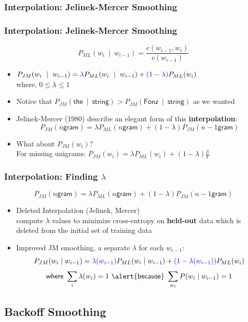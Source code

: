 \documentclass{beamer}
\begin{document}
\subsubsection{Interpolation: Jelinek-Mercer Smoothing}

\begin{frame}
\frametitle{Interpolation: Jelinek-Mercer Smoothing}
\[ P_{ML}(w_i~\mid~w_{i-1}) = \frac{ c(w_{i-1},w_i) } { c(w_{i-1}) } \]
\begin{itemize}[<+->]
\item $P_{JM}(w_i~\mid~w_{i-1}) = {\color{blue} \lambda} P_{ML}(w_i~\mid~w_{i-1}) +  {\color{blue} (1 - \lambda) }P_{ML}(w_{i})$ \\
 where, $0 \leq \lambda \leq 1$
\item Notice that  $P_{JM}(\textsf{the}~\mid~\textsf{string}) > P_{JM}(\textsf{Fonz}~\mid~\textsf{string})$ as we wanted
\item Jelinek-Mercer (1980) describe an elegant form of this {\bf interpolation}:
\[ P_{JM}(\textsf{$n$gram}) = \lambda P_{ML}(\textsf{$n$gram}) + (1 - \lambda) P_{JM}(\textsf{$n-1$gram}) \]
\item What about $P_{JM}(w_i)$? \\
For missing unigrams: $P_{JM}(w_i) = \lambda P_{ML}(w_i) + (1 - \lambda) \frac{\delta}{V}$
\end{itemize}
\end{frame}

\begin{frame}
\frametitle{Interpolation: Finding $\lambda$}
\[ P_{JM}(\textsf{$n$gram}) = \lambda P_{ML}(\textsf{$n$gram}) + (1 - \lambda) P_{JM}(\textsf{$n-1$gram}) \]
\begin{itemize}[<+->]
\item Deleted Interpolation (Jelinek, Mercer) \\
compute $\lambda$ values to minimize cross-entropy on {\bf held-out} data which is \alert{deleted} from the initial set of training data
\item Improved JM smoothing, a separate $\lambda$ for each $w_{i-1}$: 
\[ P_{JM}(w_i \mid w_{i-1}) = {\color{blue} \lambda(w_{i-1})} P_{ML}(w_i \mid w_{i-1}) + {\color{blue} (1 - \lambda(w_{i-1}))} P_{ML}(w_i) \]
\[ \textsf{where } \sum_i \lambda(w_i) = 1 \textsf{ \alert{because} } \sum_{w_i} P(w_i \mid w_{i-1}) = 1 \]
\end{itemize}
\end{frame}

\subsection{Backoff Smoothing}
\end{document}
